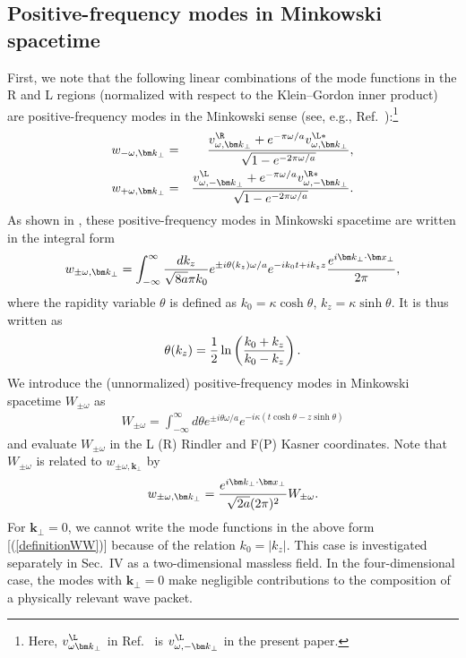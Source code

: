 \documentclass[aps,prd,preprintnumbers,nofootinbib,showpacs]{revtex4}%
\begin{document}
\begin{widetext}
\subsection{Positive-frequency modes in Minkowski spacetime  \label{3A}}
First, we note that the following 
linear combinations of the mode functions in the R and L regions (normalized with respect to the Klein--Gordon inner product) are positive-frequency modes in the Minkowski sense (see, e.g., Ref.~\cite{Higuchi}):\footnote{Here,
$v_{\omega{\bm k}_\perp}^{\L}$ in Ref.~\cite{Higuchi} is $v_{\omega,-{\bm k}_\perp}^{\L}$ in the present paper.}
\begin{eqnarray}
w_{- \omega,{\bm k}_\perp}
& = & \frac{v^\R_{\omega, {\bm k}_\perp} + e^{-\pi\omega/a}v_{\omega,{\bm k}_\perp}^{\L*}}{\sqrt{ 1 - e^{-2\pi\omega/a}}},
\label{eqfivea}
\\
w_{+\omega,{\bm k}_\perp}
& = & \frac{v^\L_{\omega,-{\bm k}_\perp} + e^{-\pi\omega/a}v_{\omega,-{\bm k}_\perp}^{\R*}}{\sqrt{1-e^{-2\pi \omega/a}}} .
\label{eqsixa}
\end{eqnarray}
As shown in \cite{Higuchi}, 
these positive-frequency modes in Minkowski spacetime are written in the integral form
\begin{eqnarray}
w_{\pm\omega,\bm k_\perp}=\int_{-\infty}^{\infty} {dk_z\over \sqrt{8a}\pi k_0}e^{\pm i\theta(k_z)\omega/a}
e^{-ik_0t+ik_zz}{e^{i\bm k_\perp\cdot \bm x_\perp}\over 2\pi},
\label{definitionw}
\end{eqnarray}
where the rapidity variable $\theta$ is defined as $k_0=\kappa \cosh\theta$, $k_z=\kappa \sinh\theta$.
It is thus written as 
\begin{eqnarray}
\theta(k_z)={1\over 2}\ln\left({k_0+k_z\over k_0-k_z}\right).
\label{definitiontheta}
\end{eqnarray}
We introduce the (unnormalized) positive-frequency modes in Minkowski spacetime $W_{\pm \omega}$ as
\begin{eqnarray}
W_{\pm \omega}=\int_{-\infty}^{\infty} {d\theta }e^{\pm i\theta\omega/a} e^{-i\kappa (t\cosh \theta-z\sinh\theta)}
\label{definitionWW}
\end{eqnarray}
and evaluate $W_{\pm \omega}$ in the L (R) Rindler and F(P) Kasner coordinates. 
Note that $W_{\pm \omega}$ is related to $w_{\pm\omega,\bm k_\perp}$ by
 \begin{eqnarray}
w_{\pm\omega,\bm k_\perp}={e^{i\bm k_\perp\cdot \bm x_\perp}\over \sqrt{2a}(2\pi)^2} W_{\pm \omega}.
\end{eqnarray}
For $\bm k_\perp=0$, we cannot write the 
mode functions in the above form [(\ref{definitionWW})] because of the relation $k_0=|k_z|$. 
This case is investigated separately in Sec.~IV as a two-dimensional massless field. 
In the four-dimensional case, the modes with $\bm k_\perp=0$ 
make negligible contributions to the composition of a physically relevant wave 
packet.


\end{widetext}
\end{document}
